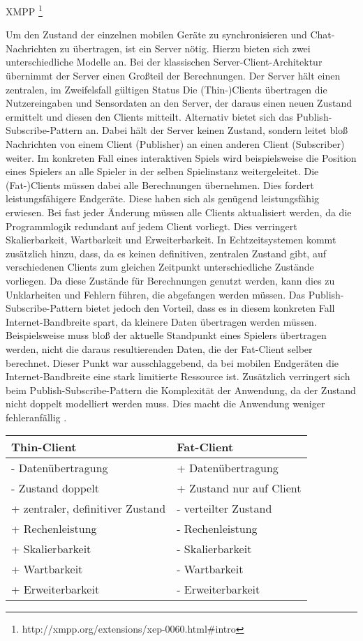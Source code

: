 XMPP \footnote{http://xmpp.org/extensions/xep-0060.html#intro}

Um den Zustand der einzelnen mobilen Geräte zu synchronisieren und Chat-Nachrichten zu übertragen, ist ein Server nötig.
Hierzu bieten sich zwei unterschiedliche Modelle an.
Bei der klassischen Server-Client-Architektur übernimmt der Server einen Großteil der Berechnungen.
Der Server hält einen zentralen, im Zweifelsfall gültigen Status
Die (Thin-)Clients übertragen die Nutzereingaben und Sensordaten an den Server, der daraus einen neuen Zustand ermittelt und diesen den Clients mitteilt.
Alternativ bietet sich das Publish-Subscribe-Pattern an. 
Dabei hält der Server keinen Zustand, sondern leitet bloß Nachrichten von einem Client (Publisher) an einen anderen Client (Subscriber) weiter.
Im konkreten Fall eines interaktiven Spiels wird beispielsweise die Position eines Spielers an alle Spieler in der selben Spielinstanz weitergeleitet.
Die (Fat-)Clients müssen dabei alle Berechnungen übernehmen. Dies fordert leistungsfähigere Endgeräte. Diese haben sich als genügend leistungsfähig erwiesen.
Bei fast jeder Änderung müssen alle Clients aktualisiert werden, da die Programmlogik redundant auf jedem Client vorliegt. Dies verringert Skalierbarkeit, Wartbarkeit und Erweiterbarkeit. In Echtzeitsystemen kommt zusätzlich hinzu, dass, da es keinen definitiven, zentralen Zustand gibt, auf verschiedenen Clients zum gleichen Zeitpunkt unterschiedliche Zustände vorliegen. Da diese Zustände für Berechnungen genutzt werden, kann dies zu Unklarheiten und Fehlern führen, die abgefangen werden müssen.
Das Publish-Subscribe-Pattern bietet jedoch den Vorteil, dass es in diesem konkreten Fall Internet-Bandbreite spart, da kleinere Daten übertragen werden müssen. Beispielsweise muss bloß der aktuelle Standpunkt eines Spielers übertragen werden, nicht die daraus resultierenden Daten, die der Fat-Client selber berechnet.
Dieser Punkt war ausschlaggebend, da bei mobilen Endgeräten die Internet-Bandbreite eine stark limitierte Ressource ist.
Zusätzlich verringert sich beim Publish-Subscribe-Pattern die Komplexität der Anwendung, da der Zustand nicht doppelt modelliert werden muss. Dies macht die Anwendung weniger fehleranfällig \cite{xmpp, http://www.sigs.de/publications/js/2003/01/schaeffer_JS_01_03.pdf}.

\begin{center}
\begin{tabular}{l|l}
	Thin-Client & Fat-Client \\
	\hline
	 - Datenübertragung & + Datenübertragung \\
	 - Zustand doppelt & + Zustand nur auf Client \\
	 + zentraler, definitiver Zustand &  - verteilter Zustand \\
	 + Rechenleistung & - Rechenleistung \\
	 + Skalierbarkeit & - Skalierbarkeit \\
	 + Wartbarkeit & - Wartbarkeit \\
	 + Erweiterbarkeit & - Erweiterbarkeit \\
\end{tabular}
\end{center}

